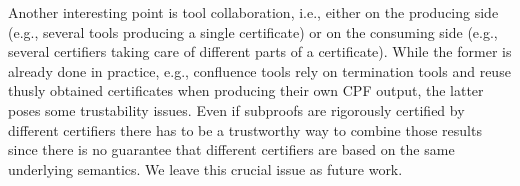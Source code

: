 \documentclass[USenglish]{eptcs}
\begin{document}
Another interesting point is tool collaboration, i.e., either on the producing
side (e.g., several tools producing a single certificate) or on the consuming
side (e.g., several certifiers taking care of different parts of a certificate).
While the former is already done in practice, e.g., confluence tools rely on
termination tools and reuse thusly obtained certificates when producing their
own CPF output, the latter poses some trustability issues. Even if subproofs are
rigorously certified by different certifiers there has to be a trustworthy way
to combine those results since there is no guarantee that different certifiers
are based on the same underlying semantics. We leave this crucial issue as
future work.




\end{document}
